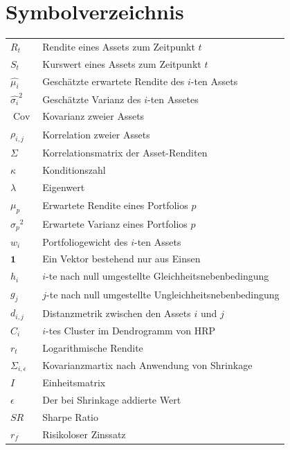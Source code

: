 \documentclass[parskip=half]{scrartcl}
\begin{document}
	\listoftables
	\clearpage
	
	\section*{Symbolverzeichnis}
	\begin{tabular}{lp{12cm}}
		$R_t$ & Rendite eines Assets zum Zeitpunkt $t$ \\
		$S_t$ & Kurswert eines Assets zum Zeitpunkt $t$ \\
		$\hat{\mu_i}$ & Geschätzte erwartete Rendite des $i$-ten Assets \\
		$\hat{\sigma_i}^2$ & Geschätzte Varianz des $i$-ten Assetes \\
		$\operatorname{Cov}$ & Kovarianz zweier Assets \\
		$\rho_{i,j}$ & Korrelation zweier Assets \\
		$\Sigma$ & Korrelationsmatrix der Asset-Renditen \\
		$\kappa$ & Konditionszahl \\
		$\lambda$ & Eigenwert \\
		$\mu_p$ & Erwartete Rendite eines Portfolios $p$ \\
		${\sigma_p}^2$ & Erwartete Varianz eines Portfolios $p$ \\
		$w_i$ & Portfoliogewicht des $i$-ten Assets \\
		$\mathbf{1}$ & Ein Vektor bestehend nur aus Einsen \\
		$h_i$ & $i$-te nach null umgestellte Gleichheitsnebenbedingung \\
		$g_j$ & $j$-te nach null umgestellte  Ungleichheitsnebenbedingung \\
		$d_{i,j}$ & Distanzmetrik zwischen den Assets $i$ und $j$ \\
		$C_i$ & $i$-tes Cluster im Dendrogramm von HRP \\
		$r_t$ & Logarithmische Rendite \\
		$\Sigma_{i, \epsilon}$ & Kovarianzmartix nach Anwendung von Shrinkage \\
		$I$ & Einheitsmatrix \\
		$\epsilon$ & Der bei Shrinkage addierte Wert \\
		$SR$ & Sharpe Ratio \\
		$r_f$ & Risikoloser Zinssatz \\
	\end{tabular}
	
\end{document}
